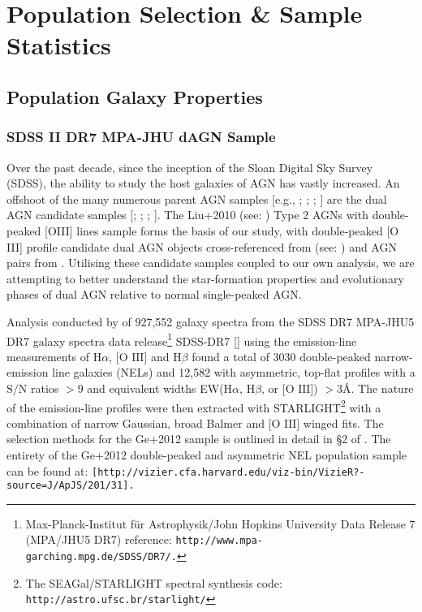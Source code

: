 \section{Population Selection \& Sample Statistics}
\subsection{Population Galaxy Properties}
\subsubsection{SDSS II DR7 MPA-JHU dAGN Sample}

Over the past decade, since the inception of the Sloan Digital Sky Survey (SDSS), the ability to study the host galaxies of AGN has vastly increased. An offshoot of the many numerous parent AGN samples [e.g., \cite{Zakamska2003}; \cite{Kewley_2006}; \cite{Stasinska_2006}; \cite{Wild_2010}] are the dual AGN candidate samples [\cite{Smith_2010}; \cite{Liu_2012}; \cite{Ge_Hu_Wang_Bai_Zhang_2012}; \cite{2012ApJ...753...42C}]. The Liu+2010 (see: \cite{Liu_2009}) Type 2 AGNs with double-peaked [OIII] lines sample forms the basis of our study, with double-peaked [O III] profile candidate dual AGN objects cross-referenced from (see: \cite{Ge_Hu_Wang_Bai_Zhang_2012}) and AGN pairs from \cite{Liu_2012}. Utilising these candidate samples coupled to our own analysis, we are attempting to better understand the star-formation properties and evolutionary phases of dual AGN relative to normal single-peaked AGN. 

Analysis conducted by \cite{Ge_Hu_Wang_Bai_Zhang_2012} of 927,552 galaxy spectra from the SDSS DR7 MPA-JHU5 DR7 galaxy spectra data release\footnote{\tiny{Max-Planck-Institut für Astrophysik/John Hopkins University Data Release 7 (MPA/JHU5 DR7) reference: \tt{http://www.mpa-garching.mpg.de/SDSS/DR7/}.}} SDSS-DR7 [\cite{2009ApJS..182..543A}] using the emission-line measurements of $\text{H}\alpha$, $\text{[O III]}$ and $\text{H}\beta$ found a total of 3030 double-peaked narrow-emission line galaxies (NELs) and 12,582 with asymmetric, top-ﬂat proﬁles with a $\text{S/N}$ ratios ${>}{9}$ and equivalent widths EW($\text{H}\alpha$, $\text{H}\beta$, or $\text{[O III]}$) ${>}{3}Å$. The nature of the emission-line profiles were then extracted with STARLIGHT\footnote{\tiny{The SEAGal/STARLIGHT spectral synthesis code: \tt{http://astro.ufsc.br/starlight/}}} with a combination of narrow Gaussian, broad Balmer and $\text{[O III]}$ winged fits. The selection methods for the Ge+2012 sample is outlined in detail in §2 of \cite{Ge_Hu_Wang_Bai_Zhang_2012}. The entirety of the Ge+2012 double-peaked and asymmetric NEL population sample can be found at: \tt{[http://vizier.cfa.harvard.edu/viz-bin/VizieR?-source=J/ApJS/201/31]}.

